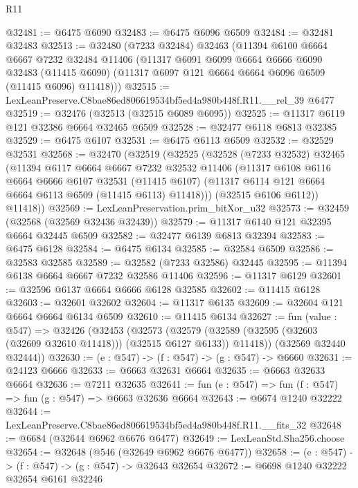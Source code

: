 \begin{lexlean}{R11}
\begin{coremodule}
@32481 := @6475 @6090
@32483 := @6475 @6096 @6509
@32484 := @32481 @32483
@32513 := @32480
    (@7233 @32484)
    @32463
    (@11394
      @6100
      @6664
      @6667
      @7232
      @32484
      @11406
      (@11317
        @6091
        @6099
        @6664
        @6666
        @6090
        @32483
        (@11415 @6090)
        (@11317 @6097 @121 @6664 @6664 @6096 @6509 (@11415 @6096) @11418)))
@32515 := LexLeanPreserve.C8bae86ed806619534bf5ed4a980b448f.R11.__rel_39 @6477
@32519 := @32476 (@32513 (@32515 @6089 @6095))
@32525 := @11317 @6119 @121 @32386 @6664 @32465 @6509
@32528 := @32477 @6118 @6813 @32385
@32529 := @6475 @6107
@32531 := @6475 @6113 @6509
@32532 := @32529 @32531
@32568 := @32470
    (@32519
      (@32525
        (@32528
          (@7233 @32532)
          @32465
          (@11394
            @6117
            @6664
            @6667
            @7232
            @32532
            @11406
            (@11317
              @6108
              @6116
              @6664
              @6666
              @6107
              @32531
              (@11415 @6107)
              (@11317 @6114 @121 @6664 @6664 @6113 @6509 (@11415 @6113) @11418)))
          (@32515 @6106 @6112))
        @11418))
@32569 := LexLeanPreservation.prim_bitXor_u32
@32573 := @32459 (@32568 (@32569 @32436 @32439))
@32579 := @11317 @6140 @121 @32395 @6664 @32445 @6509
@32582 := @32477 @6139 @6813 @32394
@32583 := @6475 @6128
@32584 := @6475 @6134
@32585 := @32584 @6509
@32586 := @32583 @32585
@32589 := @32582 (@7233 @32586) @32445
@32595 := @11394 @6138 @6664 @6667 @7232 @32586 @11406
@32596 := @11317 @6129
@32601 := @32596 @6137 @6664 @6666 @6128 @32585
@32602 := @11415 @6128
@32603 := @32601 @32602
@32604 := @11317 @6135
@32609 := @32604 @121 @6664 @6664 @6134 @6509
@32610 := @11415 @6134
@32627 := fun (value : @547) =>
  @32426
    (@32453
      (@32573
        (@32579 (@32589 (@32595 (@32603 (@32609 @32610 @11418))) (@32515 @6127 @6133)) @11418))
      (@32569 @32440 @32444))
@32630 := (e : @547) -> (f : @547) -> (g : @547) -> @6660
@32631 := @24123 @6666
@32633 := @6663 @32631 @6664
@32635 := @6663 @32633 @6664
@32636 := @7211 @32635
@32641 := fun (e : @547) => fun (f : @547) => fun (g : @547) => @6663 @32636 @6664
@32643 := @6674 @1240 @32222
@32644 := LexLeanPreserve.C8bae86ed806619534bf5ed4a980b448f.R11.__fits_32
@32648 := @6684 (@32644 @6962 @6676 @6477)
@32649 := LexLeanStd.Sha256.choose
@32654 := @32648 (@546 (@32649 @6962 @6676 @6477))
@32658 := (e : @547) -> (f : @547) -> (g : @547) -> @32643 @32654
@32672 := @6698
    @1240
    @32222
    @32654
    @6161
    @32246

\end{coremodule}
\end{lexlean}
